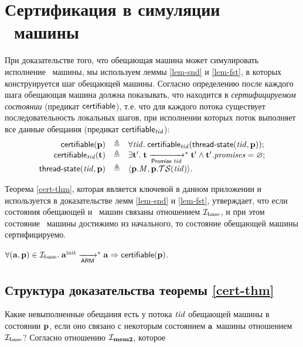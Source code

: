 \chapter{Сертификация в симуляции \ARMt~машины}
\label{sec:app:cert}

При доказательстве того, что обещающая машина может симулировать исполнение \ARMt~машины,
мы используем леммы \ref{lem-snd} и \ref{lem-fst}, в которых конструируется шаг обещающей машины.
Согласно определению после каждого шага обещающая машина должна показывать, что находится в \emph{сертифицируемом состоянии}
(предикат $\mathsf{certifiable}$), т.е. что для каждого потока существует последовательность
локальных шагов, при исполнении которых поток
выполняет все данные обещания (предикат $\mathsf{certifiable}_{\mathit{tid}}$):
\[\begin{array}{r l l}
\mathsf{certifiable}(\mathbf{p}) & \triangleq & \forall \mathit{tid}. \; \mathsf{certifiable}_{\mathit{tid}}(\textup{\sf thread-state}(\mathit{tid},\mathbf{p})); \\
\mathsf{certifiable}_{\mathit{tid}}(\mathbf{t}) & \triangleq & \exists \mathbf{t}'. \; \mathbf{t} \xrightarrow[\mathsf{Promise} \; \mathit{tid}]{}^{*} \mathbf{t}' \land \mathbf{t}'.\mathit{promises} = \varnothing; \\
\textup{\sf thread-state}(\mathit{tid}, \mathbf{p}) & \triangleq & \langle \mathbf{p}.\mathit{M}, \mathbf{p}.\mathcal{TS}(\mathit{tid}) \rangle. \\
\end{array}\]

Теорема \ref{cert-thm}, которая является ключевой в данном приложении и используется в доказательстве
лемм \ref{lem-snd} и \ref{lem-fst}, утверждает,
что если состояния обещающей и \ARMt~машин связаны отношением $\mathcal{I}_{\textup{\rm base}}$, и при этом состояние \ARMt~машины
достижимо из начального, то состояние обещающей машины сертифицируемо.
\begin{theorem}
\label{cert-thm}
$\forall (\mathbf{a}, \mathbf{p}) \in \mathcal{I}_{\textup{\rm base}}. \; \mathbf{a}^{\rm init} \xrightarrow[\mathsf{ARM}]{}^{*} \mathbf{a} \Rightarrow \mathsf{certifiable}(\mathbf{p})$.
\end{theorem}

\section{Структура доказательства теоремы \ref{cert-thm}}

Какие невыполненные обещания есть у потока $\mathit{tid}$ обещающей машины в состоянии $\mathbf{p}$,
если оно связано с некоторым состоянием $\mathbf{a}$ машины \ARMt отношением $\mathcal{I}_{\textup{\rm base}}$?
Согласно отношению $\mathcal{I}_{\rm \bf mem2}$, которое 

